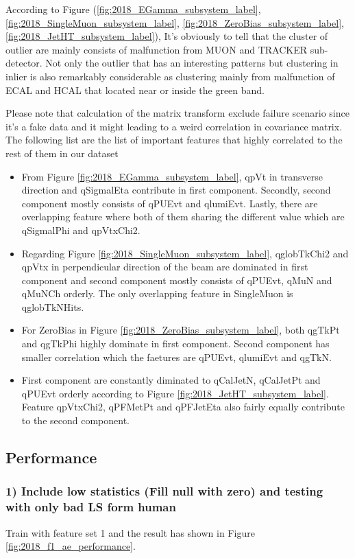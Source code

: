 According to Figure (\ref{fig:2018_EGamma_subsystem_label}, \ref{fig:2018_SingleMuon_subsystem_label}, \ref{fig:2018_ZeroBias_subsystem_label}, \ref{fig:2018_JetHT_subsystem_label}), It's obviously to tell that the cluster of outlier are mainly consists of malfunction from MUON and TRACKER sub-detector. Not only the outlier that has an interesting patterns but clustering in inlier is also remarkably considerable as clustering mainly from malfunction of ECAL and HCAL that located near or inside the green band.

Please note that calculation of the matrix transform exclude failure scenario since it's a fake data and it might leading to a weird correlation in covariance matrix.
The following list are the list of important features that highly correlated to the rest of them in our dataset
\begin{itemize}
    \item From Figure \ref{fig:2018_EGamma_subsystem_label}, qpVt in transverse direction and qSigmalEta contribute in first component.
    Secondly, second component mostly consists of qPUEvt and qlumiEvt. Lastly, there are overlapping feature where both of them sharing the different value which are qSigmalPhi and qpVtxChi2.
    \item Regarding Figure \ref{fig:2018_SingleMuon_subsystem_label}, qglobTkChi2 and qpVtx in perpendicular direction of the beam are dominated in first component and second component mostly consists of qPUEvt, qMuN and qMuNCh orderly.
    The only overlapping feature in SingleMuon is qglobTkNHits.
    \item For ZeroBias in Figure \ref{fig:2018_ZeroBias_subsystem_label}, both qgTkPt and qgTkPhi highly dominate in first component.
    Second component has smaller correlation which the faetures are qPUEvt, qlumiEvt and qgTkN.
    \item First component are constantly diminated to qCalJetN, qCalJetPt and qPUEvt orderly according to Figure \ref{fig:2018_JetHT_subsystem_label}.
    Feature qpVtxChi2, qPFMetPt and qPFJetEta also fairly equally contribute to the second component. 
\end{itemize}

\subsection{Performance}
\subsubsection{1) Include low statistics (Fill null with zero) and testing with only bad LS form human}
Train with feature set 1 and the result has shown in Figure \ref{fig:2018_f1_ae_performance}.

